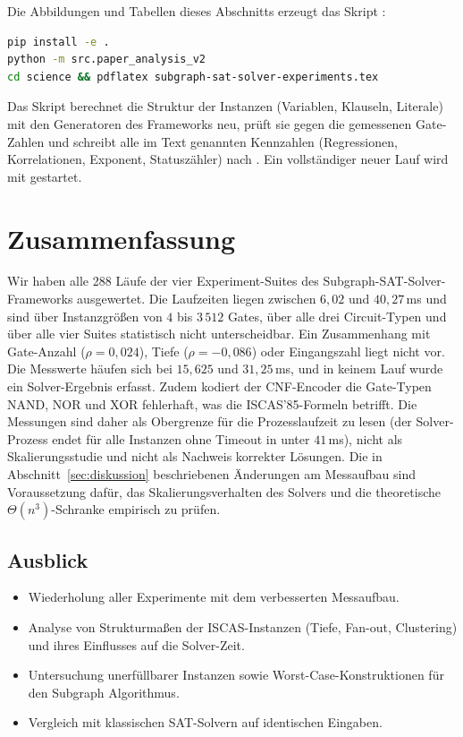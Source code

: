 \documentclass[a4paper,12pt]{article}
\theoremstyle{definition}
\begin{document}
Die Abbildungen und Tabellen dieses Abschnitts erzeugt das Skript :

\begin{lstlisting}[language=bash, caption=Erzeugung der Auswertung der neuen Version]
pip install -e .
python -m src.paper_analysis_v2
cd science && pdflatex subgraph-sat-solver-experiments.tex
\end{lstlisting}

Das Skript berechnet die Struktur der Instanzen (Variablen, Klauseln, Literale) mit den Generatoren des Frameworks neu, prüft sie gegen die gemessenen Gate-Zahlen und schreibt alle im Text genannten Kennzahlen (Regressionen, Korrelationen, Exponent, Statuszähler) nach . Ein vollständiger neuer Lauf wird mit  gestartet.

\section{Zusammenfassung}

Wir haben alle 288 Läufe der vier Experiment-Suites des Subgraph-SAT-Solver-Frameworks ausgewertet. Die Laufzeiten liegen zwischen $6{,}02$ und $40{,}27$\,ms und sind über Instanzgrößen von $4$ bis $3\,512$ Gates, über alle drei Circuit-Typen und über alle vier Suites statistisch nicht unterscheidbar. Ein Zusammenhang mit Gate-Anzahl ($\rho = 0{,}024$), Tiefe ($\rho = -0{,}086$) oder Eingangszahl liegt nicht vor. Die Messwerte häufen sich bei $15{,}625$ und $31{,}25$\,ms, und in keinem Lauf wurde ein Solver-Ergebnis erfasst. Zudem kodiert der CNF-Encoder die Gate-Typen NAND, NOR und XOR fehlerhaft, was die ISCAS'85-Formeln betrifft. Die Messungen sind daher als Obergrenze für die Prozesslaufzeit zu lesen (der Solver-Prozess endet für alle Instanzen ohne Timeout in unter $41$\,ms), nicht als Skalierungsstudie und nicht als Nachweis korrekter Lösungen. Die in Abschnitt~\ref{sec:diskussion} beschriebenen Änderungen am Messaufbau sind Voraussetzung dafür, das Skalierungsverhalten des Solvers und die theoretische $\Theta(n^3)$-Schranke empirisch zu prüfen.

\subsection{Ausblick}

\begin{itemize}
	\item Wiederholung aller Experimente mit dem verbesserten Messaufbau.
	\item Analyse von Strukturmaßen der ISCAS-Instanzen (Tiefe, Fan-out, Clustering) und ihres Einflusses auf die Solver-Zeit.
	\item Untersuchung unerfüllbarer Instanzen sowie Worst-Case-Konstruktionen für den Subgraph Algorithmus.
	\item Vergleich mit klassischen SAT-Solvern auf identischen Eingaben.
\end{itemize}
\end{document}
